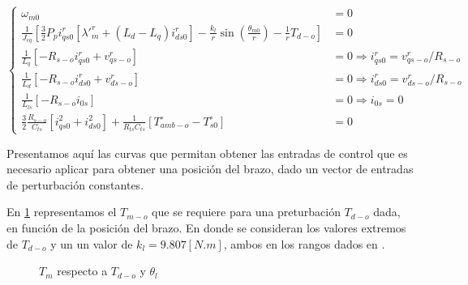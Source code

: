 \documentclass[a4paper, 10pt, onecolumn,journal]{ieeeconf}
\begin{document}
\begin{equation}
    \begin{cases}
        \omega_{m0} &= 0\\
        \frac{1}{J_{eq}}\left[\frac{3}{2} P_p i^r_{qs0}\left[\lambda'^r_m + (L_d - L_q) i^r_{ds0} \right] - \frac{k_l}{r}\sin\left(\frac{\theta_{m0}}{r}\right) - \frac{1}{r}T_{d-o}\right] &= 0\\
        \frac{1}{L_q}\left[-R_{s-o} i^r_{qs0} + v^r_{qs-o}\right] &= 0 \Rightarrow i^r_{qs0} = v^r_{qs-o}/R_{s-o}\\ 
        \frac{1}{L_d}\left[-R_{s-o} i^r_{ds0} + v^r_{ds-o}\right] &= 0 \Rightarrow i^r_{ds0} = v^r_{ds-o}/R_{s-o}\\ 
        \frac{1}{L_{ls}}\left[-R_{s-o} i_{0s}\right] &= 0 \Rightarrow i_{0s} = 0\\ 
        \frac{3}{2}\frac{R_{s-o}}{C_{ts}} \left[ i_{qs0}^2+ i_{ds0}^2 \right] + \frac{1}{R_{ts}C_{ts}}\left[T^{\circ}_{amb-o} - T_{s0}^{\circ}\right] &= 0
    \end{cases}
    \label{modelo de operacion NL cuasi_estacionario desarrollado reducido}
\end{equation}

Presentamos aquí las curvas que permitan obtener las entradas
de control que es necesario aplicar para obtener una posición
del brazo, dado un vector de entradas de perturbación constantes.

En \cref{T_m en función de la posición y T_do} representamos
el $T_{m-o}$ que se requiere para una preturbación $T_{d-o}$ dada,
en función de la posición del brazo. En donde se
consideran los valores extremos de $T_{d-o}$ y un
un valor de $k_l = 9.807 \left[N.m\right]$, ambos en los rangos
dados en \cite{c1}.

\begin{figure}[thpb]
    \centering
    \begin{adjustbox}{scale = 0.6}
    \end{adjustbox}
    \caption{$T_m$ respecto a $T_{d-o}$ y $\theta_l$}
    \label{T_m en función de la posición y T_do}
\end{figure}
\end{document}
